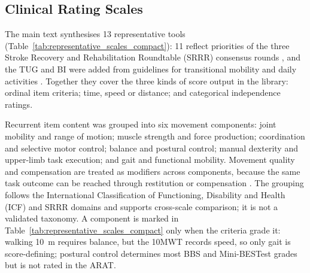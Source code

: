 \documentclass[11pt]{article}
\begin{document}
\subsection{Clinical Rating Scales}
\label{sec:clinical_rating_scales}

The main text synthesises 13 representative tools (Table~\ref{tab:representative_scales_compact}): 11 reflect priorities of the three Stroke Recovery and Rehabilitation Roundtable (SRRR) consensus rounds \cite{CoreKwakkel2017SRRRSensorimotor,CoreKwakkel2019SRRRUpperLimb,CoreVanCriekinge2024SRRRBalanceMobility}, and the TUG and BI were added from guidelines for transitional mobility and daily activities \cite{S1Winstein2016AHAASARehab,S1VADoD2024StrokeRehab}. Together they cover the three kinds of score output in the library: ordinal item criteria; time, speed or distance; and categorical independence ratings.

Recurrent item content was grouped into six movement components: joint mobility and range of motion; muscle strength and force production; coordination and selective motor control; balance and postural control; manual dexterity and upper-limb task execution; and gait and functional mobility. Movement quality and compensation are treated as modifiers across components, because the same task outcome can be reached through restitution or compensation \cite{Levin2009RecoveryCompensation,CoreKwakkel2019SRRRUpperLimb}. The grouping follows the International Classification of Functioning, Disability and Health (ICF) and SRRR domains \cite{WHO2001ICF,Cieza2019ICFLinking,CoreKwakkel2017SRRRSensorimotor} and supports cross-scale comparison; it is not a validated taxonomy. A component is marked in Table~\ref{tab:representative_scales_compact} only when the criteria grade it: walking 10~m requires balance, but the 10MWT records speed, so only gait is score-defining; postural control determines most BBS and Mini-BESTest grades but is not rated in the ARAT.
\end{document}

